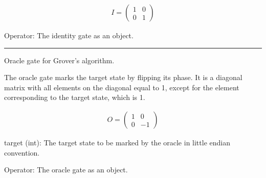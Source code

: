 \documentclass[letterpaper,10pt,english]{sphinxmanual}
\begin{document}
\begin{fulllineitems}
\begin{fulllineitems}
\sphinxAtStartPar
{}
\begin{equation*}
\begin{split}I = 
    \begin{pmatrix}
        1 & 0 \\
        0 & 1
    \end{pmatrix}\end{split}
\end{equation*}\begin{description}
\sphinxAtStartPar
Operator: The identity gate as an  object.

\end{description}

\end{fulllineitems}



\bigskip\hrule\bigskip


\begin{fulllineitems}
\label{\detokenize{index:gates.Gate.oracle}}
\pysigstartsignatures
{}
\pysigstopsignatures
\sphinxAtStartPar
Oracle gate for Grover’s algorithm.

\sphinxAtStartPar
The oracle gate marks the target state by flipping its phase. It is a
diagonal matrix with all elements on the diagonal equal to 1, except for
the element corresponding to the target state, which is \sphinxhyphen{}1.

\sphinxAtStartPar
{}
\begin{equation*}
\begin{split}O = 
    \begin{pmatrix}
        1 & 0 \\
        0 & -1
    \end{pmatrix}\end{split}
\end{equation*}\begin{description}
\sphinxAtStartPar
target (int): The target state to be marked by the oracle in little endian convention.

\sphinxAtStartPar
Operator: The oracle gate as an  object.


\end{description}
\end{fulllineitems}
\end{fulllineitems}
\end{document}
